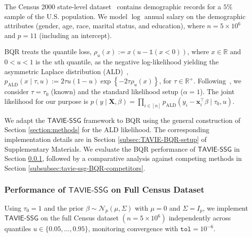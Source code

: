 \documentclass[12pt]{article}
\numberwithin{equation}{section}
\newcommand{\tssg}{\mathsf{TAVIE}\text{-}\mathsf{SSG}}
\begin{document}
The Census 2000 state-level dataset~\citep{yang-FastQR-pmlr} contains demographic records for a $5\%$ sample of the U.S. population. We model $\log$ annual salary on the demographic attributes (gender, age, race, marital status, and education), where $n=5\times 10^6$ and $p=11$ (including an intercept).

BQR treats the quantile loss, $\rho_u(x):= x(u - \mathds{1}(x<0))$, where $x\in \mathbb{R}$ and $0 < u < 1$ is the $u$th quantile, as the negative log-likelihood yielding the asymmetric Laplace distribution (ALD)~\citep{Yu-Moeed-Bayesian-QR}, $p_{\mathrm{ALD}}(x\mid \tau, u) := 2\tau u(1-u)\exp\left\{-2\tau \rho_u(x)\right\}$, for $\tau\in \mathbb{R}^{+}$. Following~\cite{yang-FastQR-pmlr}, we consider $\tau=\tau_0$ (known) and the standard likelihood setup ($\alpha=1$). The joint likelihood for our purpose is $p(y\mid \mathbf{X}, \beta) = \prod_{i\in [n]}p_{\mathrm{ALD}}(y_i - \mathbf{x}_i^{\top}\beta\mid \tau_0, u)$.

We adapt the $\tssg$ framework to BQR using the general construction of Section \ref{section:methods} for the ALD likelihood. The corresponding implementation details are in Section \ref{subsec:TAVIE-BQR-setup} of Supplementary Materials. We evaluate the BQR performance of $\tssg$ in Section \ref{subsubsec:TAVIE-SSG-BQR}, followed by a comparative analysis against competing methods in Section \ref{subsubsec:tavie-ssg-BQR-competitors}.


\subsubsection{Performance of \texorpdfstring{$\tssg$}{TAVIE-SSG} on Full Census Dataset}\label{subsubsec:TAVIE-SSG-BQR}

Using $\tau_0=1$ and the prior $\beta\sim\mathcal N_p(\mu,\Sigma)$ with $\mu=0$ and $\Sigma=I_p$, we implement $\tssg$ on the full Census dataset $(n=5\times10^6)$ independently across quantiles $u\in\{0.05,\ldots,0.95\}$, monitoring convergence with $\texttt{tol}=10^{-6}$.
\end{document}
